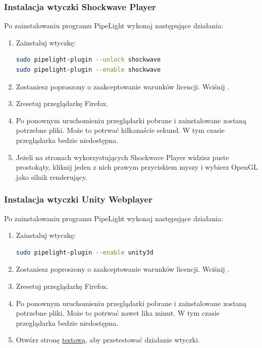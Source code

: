 \subsubsection{Instalacja wtyczki Shockwave Player}
\noindent Po zainstalowaniu programu PipeLight wykonaj następujące działania:
\begin{enumerate}
\item Zainstaluj wtyczkę:
\begin{lstlisting}[language=bash]
sudo pipelight-plugin --unlock shockwave
sudo pipelight-plugin --enable shockwave
\end{lstlisting}
\item Zostaniesz poproszony o zaakceptowanie warunków licencji. Wciśnij .
\item Zresetuj przeglądarkę Firefox.
\item Po ponownym uruchomieniu przeglądarki pobrane i zainstalowane zostaną potrzebne pliki. Może to potrwać kilkanaście sekund. W tym czasie przeglądarka bedzie niedostępna.
\item Jeżeli na stronach wykorzystujących Shockwave Player widzisz puste prostokąty, kliknij jeden z nich prawym przyciskiem myszy i wybierz \textcolor{ubuntu_orange}{OpenGL} jako silnik renderujący.
\end{enumerate}

\subsubsection{Instalacja wtyczki Unity Webplayer}
\noindent Po zainstalowaniu programu PipeLight wykonaj następujące działania:
\begin{enumerate}
\item Zainstaluj wtyczkę:
\begin{lstlisting}[language=bash]
sudo pipelight-plugin --enable unity3d
\end{lstlisting}
\item Zostaniesz poproszony o zaakceptowanie warunków licencji. Wciśnij .
\item Zresetuj przeglądarkę Firefox.
\item Po ponownym uruchomieniu przeglądarki pobrane i zainstalowane zostaną potrzebne pliki. Może to potrwać nawet lika minut. W tym czasie przeglądarka bedzie niedostępna.
\item Otwórz stronę \href{https://unity3d.com/showcase/live-demos}{testową}, aby przetestować działanie wtyczki.
\end{enumerate}

